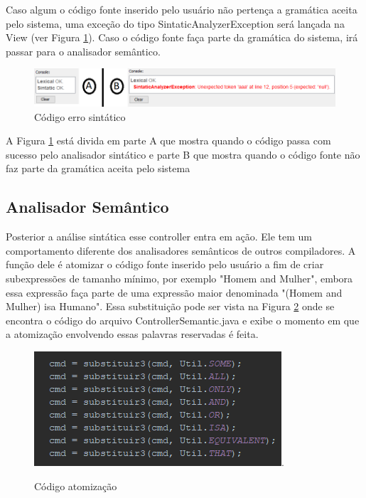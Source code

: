 \documentclass{bcc}
\begin{document}
Caso algum o código fonte inserido pelo usuário não pertença a gramática aceita pelo sistema, uma exceção do tipo SintaticAnalyzerException será lançada na View (ver Figura \ref{fig:codigoErroSintatico}). Caso o código fonte faça parte da gramática do sistema, irá passar para o analisador semântico.

\begin{figure}[H]
\centering
\includegraphics[width=.7\textwidth]{Figuras/codigo_erro_sintatico.png}
\caption{Código erro sintático}
\label{fig:codigoErroSintatico}
\end{figure}

A Figura \ref{fig:codigoErroSintatico} está divida em parte A que mostra quando o código passa com sucesso pelo analisador sintático e parte B que mostra quando o código fonte não faz parte da gramática aceita pelo sistema

\subsection{Analisador Semântico}

Posterior a análise sintática esse controller entra em ação. Ele tem um comportamento diferente dos analisadores semânticos de outros compiladores. A função dele é atomizar o código fonte inserido pelo usuário a fim de criar subexpressões de tamanho mínimo, por exemplo "Homem and Mulher", embora essa expressão faça parte de uma expressão maior denominada "(Homem and Mulher) isa Humano". Essa substituição pode ser vista na Figura \ref{fig:codigoAtomizacao} onde se encontra o código do arquivo ControllerSemantic.java e exibe o momento em que a atomização envolvendo essas palavras reservadas é feita. 

\begin{figure}[H]
\centering
\includegraphics[width=.7\textwidth]{Figuras/codigo_atomizacao.png}.
\caption{Código atomização}
\label{fig:codigoAtomizacao}
\end{figure}
\end{document}
